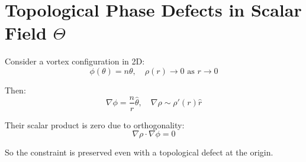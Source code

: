 \documentclass{article}
\begin{document}
\section*{Topological Phase Defects in Scalar Field \(\Theta\)}

Consider a vortex configuration in 2D:
\[
\phi(\theta) = n\theta, \quad \rho(r) \to 0 \text{ as } r \to 0
\]

Then:
\[
\nabla \phi = \frac{n}{r} \hat{\theta}, \quad \nabla \rho \sim \rho'(r) \hat{r}
\]

Their scalar product is zero due to orthogonality:
\[
\nabla \rho \cdot \nabla \phi = 0
\]

So the constraint is preserved even with a topological defect at the origin.
\end{document}
